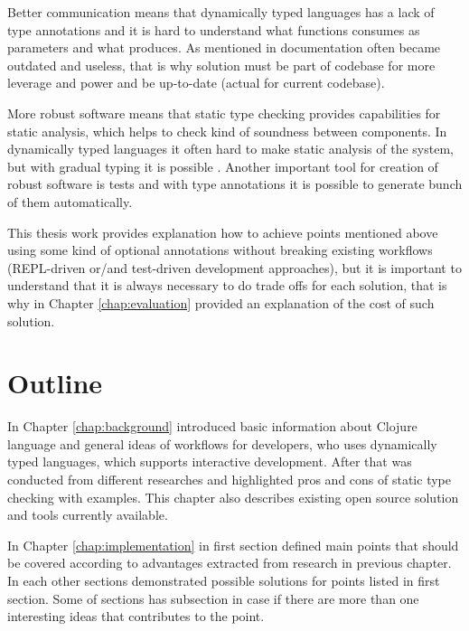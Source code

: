 Better communication means that dynamically typed languages has a lack of type
annotations and it is hard to understand what functions consumes as parameters
and what produces. As mentioned in \cite{janes2014lean} documentation often
became outdated and useless, that is why solution must be part of codebase for
more leverage and power and be up-to-date (actual for current codebase).

More robust software means that static type checking provides capabilities for
static analysis, which helps to check kind of soundness between components.
In dynamically typed languages it often hard to make static analysis of the
system, but with gradual typing it is possible \cite{tobin2008design}. Another
important tool for creation of robust software is tests and with type
annotations it is possible to generate bunch of them automatically.

This thesis work provides explanation how to achieve points mentioned above
using some kind of optional annotations without breaking existing workflows
(REPL-driven or/and test-driven development approaches), but it is important to
understand that it is always necessary to do trade offs for each solution, that
is why in Chapter \ref{chap:evaluation} provided an explanation of the cost of
such solution.



\section{Outline}
In Chapter \ref{chap:background} introduced basic information about Clojure
language and general ideas of workflows for developers, who uses dynamically
typed languages, which supports interactive development. After that was
conducted from different researches and highlighted pros and cons of static type
checking with examples. This chapter also describes existing open source solution
and tools currently available.

In Chapter \ref{chap:implementation} in first section defined main points that
should be covered according to advantages extracted from research in previous
chapter. In each other sections demonstrated possible solutions for points
listed in first section. Some of sections has subsection in case if there are
more than one interesting ideas that contributes to the point.

